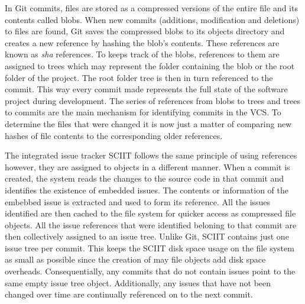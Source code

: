 \documentclass{mproj}
\begin{document}
In Git commits, files are stored as a compressed versions of the entire file and its contents called blobs. When new commits (additions, modification and deletions) to files are found, Git saves the compressed blobs to its objects directory and creates a new reference by hashing the blob's contents. These references are known as \textit{sha} references. To keeps track of the blobs, references to them are assigned to trees which may represent the folder containing the blob or the root folder of the project.  The root folder tree is then in turn referenced to the commit. This way every commit made represents the full state of the software project during development. The series of references from blobs to trees and trees to commits are the main mechanism for identifying commits in the VCS. To determine the files that were changed it is now just a matter of comparing new hashes of file contents to the corresponding older references.


The integrated issue tracker SCIIT follows the same principle of using references however, they are assigned to objects in a different manner. When a commit is created, the system reads the changes to the source code in that commit and identifies the existence of embedded issues. The contents or information of the embebbed issue is extracted and used to form its reference. All the issues identified are then cached to the file system for quicker access as compressed file objects. All the issue references that were identified beloning to that commit are then collectively assigned to an issue tree. Unlike Git, SCIIT contains just one issue tree per commit. This keeps the SCIIT disk space usage on the file system as small as possible since the creation of may file objects add disk space overheads. Consequentially, any commits that do not contain issues point to the same empty issue tree object. Additionally, any issues that have not been changed over time are continually referenced on to the next commit.
\end{document}
